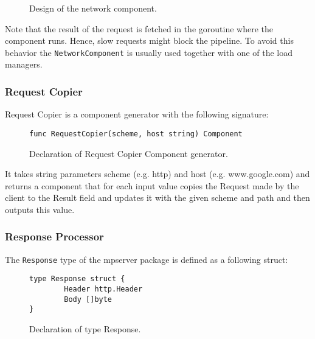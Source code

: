 \documentclass[12pt,a4paper]{article}
\begin{document}
\begin{figure}[h]
\centering
{}
\caption[scale=1.0]{Design of the network component.}
\label{fig:networkComp}
\end{figure}

Note that the result of the request is fetched in the goroutine where the
component runs. Hence, slow requests might block the pipeline. To avoid
this behavior the \texttt{NetworkComponent} is usually used together with one
of the load managers.

\subsubsection{Request Copier}
Request Copier is a component generator with the following signature:
\begin{figure}[h]
\centering
\begin{lstlisting}
func RequestCopier(scheme, host string) Component
\end{lstlisting}
\caption[scale=1.0]{Declaration of Request Copier Component generator.}
\label{fig:RequestCopier}
\end{figure}
It takes string parameters scheme (e.g. http) and host (e.g. www.google.com) 
and returns a component that for each input value copies the Request made 
by the client to the Result field and updates it with the given scheme and 
path and then outputs this value.

\subsubsection{Response Processor}
The \texttt{Response} type of the mpserver package is defined as a following struct:

\begin{figure}[h]
\centering
\begin{lstlisting}
type Response struct {
		Header http.Header
		Body []byte
}
\end{lstlisting}
\caption[scale=1.0]{Declaration of type Response.}
\label{fig:Response}
\end{figure}
\end{document}
